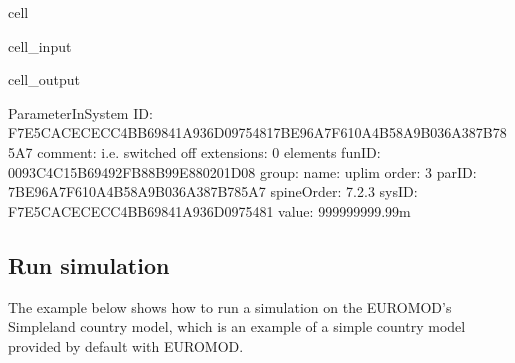 \documentclass[letterpaper,10pt,english]{sphinxmanual}
\begin{document}
\begin{sphinxuseclass}{cell}
\begin{sphinxuseclass}{cell_input}
\begin{sphinxVerbatim}[commandchars=\\\{\}]
\PYG{p}{[}\PYG{p}{]}\PYG{p}{[}\PYG{p}{]}\PYG{p}{[}\PYG{p}{]}\PYG{p}{[}\PYG{p}{]}\PYG{p}{[}\PYG{p}{]}
\end{sphinxVerbatim}

\end{sphinxuseclass}
\begin{sphinxuseclass}{cell_output}
\begin{sphinxVerbatim}[commandchars=\\\{\}]
\PYGZhy{}\PYGZhy{}\PYGZhy{}\PYGZhy{}\PYGZhy{}\PYGZhy{}\PYGZhy{}\PYGZhy{}\PYGZhy{}\PYGZhy{}\PYGZhy{}\PYGZhy{}\PYGZhy{}\PYGZhy{}\PYGZhy{}\PYGZhy{}\PYGZhy{}\PYGZhy{}\PYGZhy{}\PYGZhy{}\PYGZhy{}\PYGZhy{}\PYGZhy{}\PYGZhy{}\PYGZhy{}\PYGZhy{}\PYGZhy{}\PYGZhy{}\PYGZhy{}\PYGZhy{}
ParameterInSystem
\PYGZhy{}\PYGZhy{}\PYGZhy{}\PYGZhy{}\PYGZhy{}\PYGZhy{}\PYGZhy{}\PYGZhy{}\PYGZhy{}\PYGZhy{}\PYGZhy{}\PYGZhy{}\PYGZhy{}\PYGZhy{}\PYGZhy{}\PYGZhy{}\PYGZhy{}\PYGZhy{}\PYGZhy{}\PYGZhy{}\PYGZhy{}\PYGZhy{}\PYGZhy{}\PYGZhy{}\PYGZhy{}\PYGZhy{}\PYGZhy{}\PYGZhy{}\PYGZhy{}\PYGZhy{}
	 ID: \PYGZsq{}F7E5CACE\PYGZhy{}CECC\PYGZhy{}4BB6\PYGZhy{}9841\PYGZhy{}A936D09754817BE96A7F\PYGZhy{}610A\PYGZhy{}4B58\PYGZhy{}A9B0\PYGZhy{}36A387B785A7\PYGZsq{}
	 comment: \PYGZsq{}i.e. switched off\PYGZsq{}
	 extensions: 0 elements
	 funID: \PYGZsq{}0093C4C1\PYGZhy{}5B69\PYGZhy{}492F\PYGZhy{}B88B\PYGZhy{}99E880201D08\PYGZsq{}
	 group: \PYGZsq{}\PYGZsq{}
	 name: \PYGZsq{}uplim\PYGZsq{}
	 order: \PYGZsq{}3\PYGZsq{}
	 parID: \PYGZsq{}7BE96A7F\PYGZhy{}610A\PYGZhy{}4B58\PYGZhy{}A9B0\PYGZhy{}36A387B785A7\PYGZsq{}
	 spineOrder: \PYGZsq{}7.2.3\PYGZsq{}
	 sysID: \PYGZsq{}F7E5CACE\PYGZhy{}CECC\PYGZhy{}4BB6\PYGZhy{}9841\PYGZhy{}A936D0975481\PYGZsq{}
	 value: \PYGZsq{}999999999.99\PYGZsh{}m\PYGZsq{}
\end{sphinxVerbatim}

\end{sphinxuseclass}
\end{sphinxuseclass}

\subsection{Run simulation}
\label{\detokenize{getstarted:run-simulation}}
\sphinxAtStartPar
The example below shows how to run a simulation on the EUROMOD’s Simpleland country model, which is an example of a simple country model provided by default with EUROMOD.
\end{document}
